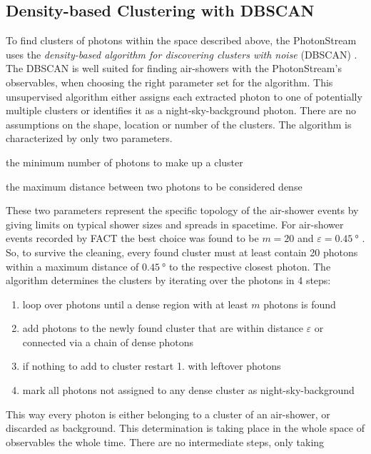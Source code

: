\subsection{Density-based Clustering with DBSCAN}\label{subsec:dbscan}
%
To find clusters of photons within the space described above, the PhotonStream
uses the \textit{density-based algorithm for discovering clusters with noise}
(DBSCAN) \cite{DBSCAN}. The DBSCAN is well suited for finding air-showers with the PhotonStream's observables, when choosing the right parameter set for the algorithm. This unsupervised algorithm either assigns each extracted photon to one of potentially multiple
clusters or identifies it as a night-sky-background photon. There are no
assumptions on the shape, location or number of the clusters. The algorithm is
characterized by only two parameters.
%
\begin{description}[]
  \item[m] the minimum number of photons to make up a cluster
  \item[$\symbf{\varepsilon}$] the maximum distance between two photons to be considered dense
\end{description}
%
These two parameters represent the specific topology of the air-shower events
by giving limits on typical shower sizes and spreads in spacetime. For
air-shower events recorded by FACT the best choice was found to be $m = 20$ and
$\varepsilon = \SI{0.45}{\degree}$ \cite{sebastian}. So, to survive the cleaning, every found
cluster must at least contain 20 photons within a maximum distance of
$\SI{0.45}{\degree}$ to the respective closest photon. The algorithm determines
the clusters by iterating over the photons in 4 steps:
%
\begin{enumerate}
  \item loop over photons until a dense region with at least $m$ photons is found
  \item add photons to the newly found cluster that are within distance $\varepsilon$ or connected via a chain of dense photons
  \item if nothing to add to cluster restart 1. with leftover photons
  \item mark all photons not assigned to any dense cluster as night-sky-background
\end{enumerate}
%
This way every photon is either belonging to a cluster of an air-shower, or
discarded as background. This determination is taking place in the whole space
of observables the whole time. There are no intermediate steps, only taking
